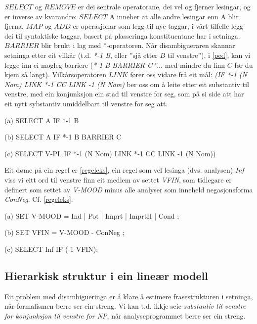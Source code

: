 \documentclass[a4paper,nynorsk]{article}
\begin{document}
$SELECT$ og $REMOVE$ er dei sentrale operatorane, dei vel og fjerner lesingar, og er inverse av kvarandre: $SELECT$ A inneber at alle andre lesingar enn A blir fjerna. $MAP$ og $ADD$ er operasjonar som legg til nye taggar, i vårt tilfelle legg dei til syntaktiske taggar, basert på plasseringa konstituentane har i setninga. $BARRIER$ blir brukt i lag med *-operatoren. Når disambigueraren skannar setninga etter eit vilkår (t.d. \textit{*-1 B}, eller ''sjå etter $B$ til venstre''), i \ref{ped}, kan vi legge inn ei mogleg barriere  (\textit{*-1 B BARRIER C} ''... med mindre du finn $C$ før du kjem så langt). Vilkårsoperatoren $LINK$ fører oss vidare frå eit mål: \textit{(IF *-1 (N Nom) LINK *-1 CC LINK -1 (N Nom)} ber oss om å leite etter eit substantiv til venstre, med ein konjunksjon ein stad til venstre for seg, som på si side att har eit nytt sybstantiv umiddelbart til venstre for seg att.%

\begin{example}\label{ped}
\item[(a)] SELECT A IF *-1 B
\item[(b)] SELECT A IF *-1 B BARRIER C
\item[(c)] SELECT V-PL IF *-1 (N Nom) LINK *-1 CC LINK -1 (N Nom))
\end{example}

Eit døme på ein regel er \ref{regeleks}, ein regel som vel lesinga (dvs. analysen) \emph{Inf} viss vi eitt ord til venstre finn eit medlem av settet \emph{VFIN}, som  tidlegare er definert som settet av \emph{V-MOOD} minus alle analyser som inneheld negasjonsforma \emph{ConNeg}. Cf. \ref{regeleks}.  %

\begin{example}\label{regeleks}
\item[(a)] SET V-MOOD = Ind | Pot | Imprt | ImprtII | Cond ; 
\item[(b)] SET VFIN  =  V-MOOD - ConNeg ; 
\item[(c)] SELECT Inf IF (-1 VFIN); 
\end{example}%

\subsection{Hierarkisk struktur i ein lineær modell}

Eit problem med disambigueringa er å klare å estimere frasestrukturen i setninga, når formalismen berre ser ein streng. Vi kan t.d. ikkje seie \textit{substantiv til venstre for konjunksjon til venstre for NP}, når analyseprogrammet berre ser ein streng. %
\end{document}
